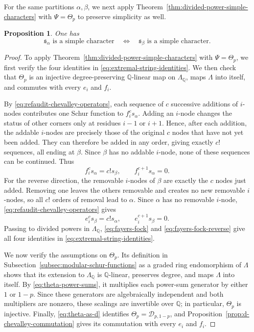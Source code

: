\documentclass[12pt,reqno,a4paper]{amsart}
\numberwithin{equation}{section}
\numberwithin{figure}{section}
\theoremstyle{plain}
\newtheorem{proposition}[theorem]{Proposition}
\theoremstyle{definition}
\begin{document}
For the same partitions $\alpha,\beta$, we next apply
Theorem~\ref{thm:divided-power-simple-characters} with
$\Psi=\Theta_p$ to preserve simplicity as well.

\begin{proposition}
\label{prop:adjacent-simplicity}
One has
\[
\mathfrak{s}_\alpha\text{ is a simple character}
\quad\Longleftrightarrow\quad
\mathfrak{s}_\beta\text{ is a simple character}.
\]
\end{proposition}

\begin{proof}
To apply Theorem~\ref{thm:divided-power-simple-characters} with
$\Psi=\Theta_p$, we first verify the four identities in
\eqref{eq:extremal-string-identities}.  We then check that $\Theta_p$
is an injective degree-preserving $\mathbb Q$-linear map on
$\Lambda_{\mathbb Q}$, maps $\Lambda$ into itself, and commutes
with every $e_i$ and $f_i$.

By \eqref{eq:refaudit-chevalley-operators}, each sequence of $c$
successive additions of $i$-nodes contributes one Schur function to
$f_i^c s_\alpha$.  Adding an $i$-node changes the status of other
corners only at residues $i-1$ or $i+1$.  Hence, after each addition,
the addable $i$-nodes are precisely those of the original $c$
nodes that have not yet been added.  They can therefore be added in
any order, giving exactly $c!$ sequences, all ending at $\beta$.
Since $\beta$ has no addable $i$-node, none of these sequences can
be continued.  Thus
\begin{equation}\label{eq:fayers-fock}
f_i^c s_\alpha=c!s_\beta,\qquad f_i^{c+1}s_\alpha=0.
\end{equation}
For the reverse direction, the removable $i$-nodes of $\beta$ are
exactly the $c$ nodes just added.  Removing one leaves the others
removable and creates no new removable $i$-nodes, so all $c!$
orders of removal lead to $\alpha$.  Since $\alpha$ has no removable
$i$-node, \eqref{eq:refaudit-chevalley-operators} gives
\begin{equation}\label{eq:fayers-fock-reverse}
e_i^c s_\beta=c!s_\alpha,\qquad e_i^{c+1}s_\beta=0.
\end{equation}
Passing to divided powers in $\Lambda_{\mathbb Q}$,
\eqref{eq:fayers-fock} and \eqref{eq:fayers-fock-reverse} give all
four identities in \eqref{eq:extremal-string-identities}.

We now verify the assumptions on $\Theta_p$.  Its definition in
Subsection~\ref{subsec:modular-schur-functions} as a graded ring
endomorphism of $\Lambda$ shows that its extension to
$\Lambda_{\mathbb Q}$ is $\mathbb Q$-linear, preserves degree, and
maps $\Lambda$ into itself.  By \eqref{eq:theta-power-sums}, it
multiplies each power-sum generator by either $1$ or $1-p$.
Since these generators are algebraically independent and both
multipliers are nonzero, these scalings are invertible over
$\mathbb Q$; in particular, $\Theta_p$ is injective.
Finally, \eqref{eq:theta-as-d} identifies
$\Theta_p=\mathcal D_{p,1-p}$, and
Proposition~\ref{prop:d-chevalley-commutation} gives its commutation
with every $e_i$ and $f_i$.


\end{proof}
\end{document}
